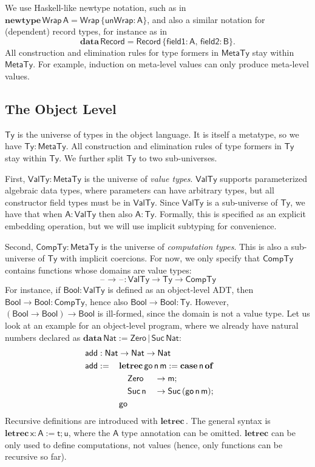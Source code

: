 \documentclass[acmsmall,screen]{acmart}
\newcommand{\mit}[1]{{\mathsf{#1}}}
\newcommand{\msf}[1]{{\mathsf{#1}}}
\newcommand{\mbf}[1]{{\mathbf{#1}}}
\newcommand{\bs}[1]{\boldsymbol{#1}}
\newcommand{\ind}{\hspace{1em}}
\newcommand{\data}{\mbf{data}\,}
\newcommand{\letrec}{\mbf{letrec}\,}
\newcommand{\of}{\mbf{of}\,}
\newcommand{\go}{\mit{go}}
\newcommand{\add}{\mit{add}}
\newcommand{\vm}{\mathsf{m}}
\newcommand{\vn}{\mathsf{n}}
\newcommand{\vA}{\mathsf{A}}
\newcommand{\vB}{\mathsf{B}}
\newcommand{\vx}{\mathsf{x}}
\newcommand{\vt}{\mathsf{t}}
\newcommand{\vu}{\mathsf{u}}
\newcommand{\Bool}{\msf{Bool}}
\newcommand{\case}{\mbf{case\,}}
\newcommand{\MTy}{\msf{MetaTy}}
\newcommand{\VTy}{\msf{ValTy}}
\newcommand{\Ty}{\msf{Ty}}
\newcommand{\CTy}{\msf{CompTy}}
\newcommand{\blank}{{\mathord{\hspace{1pt}\text{--}\hspace{1pt}}}}
\newcommand{\Nat}{\msf{Nat}}
\newcommand{\Zero}{\msf{Zero}}
\newcommand{\Suc}{\msf{Suc}}
\theoremstyle{remark}
\newcommand{\newtype}{\mbf{newtype}\,}
\begin{document}
We use Haskell-like newtype notation, such as in $\newtype \msf{Wrap}\,\vA =
\msf{Wrap}\,\{\mit{unWrap} : \vA \}$, and also a similar notation for (dependent)
record types, for instance as in
\[\data \msf{Record} = \msf{Record}\,\{\mit{field1} : \vA,\,\mit{field2} : \vB\}.\]
All construction and elimination rules for type formers in $\MTy$ stay within
$\MTy$. For example, induction on meta-level values can only produce meta-level
values.

\subsection{The Object Level}\label{sec:the-object-level}

$\bs{\Ty}$ is the universe of types in the object language. It is itself a
metatype, so we have $\Ty : \MTy$. All construction and elimination rules of
type formers in $\Ty$ stay within $\Ty$. We further split $\Ty$ to two
sub-universes.

First, $\bs{\VTy} : \MTy$ is the universe of \emph{value types}. $\VTy$ supports
parameterized algebraic data types, where parameters can have arbitrary types,
but all constructor field types must be in $\VTy$. Since $\VTy$ is a
sub-universe of $\Ty$, we have that when $\vA : \VTy$ then also $\vA :
\Ty$. Formally, this is specified as an explicit embedding operation, but we
will use implicit subtyping for convenience.

Second, $\bs{\CTy} : \MTy$ is the universe of \emph{computation types}. This is
also a sub-universe of $\Ty$ with implicit coercions. For now, we only specify
that $\CTy$ contains functions whose domains are value types:
\[ \blank\to\blank : \VTy \to \Ty \to \CTy \]
For instance, if $\Bool : \VTy$ is defined as an object-level ADT, then $\Bool
\to \Bool : \CTy$, hence also $\Bool \to \Bool : \Ty$. However, $(\Bool \to
\Bool) \to \Bool$ is ill-formed, since the domain is not a value type. Let us look at an
example for an object-level program, where we already have natural numbers
declared as $\data \Nat := \Zero\,|\,\Suc\,\Nat$:
\begin{alignat*}{3}
  &\hspace{-1em}\rlap{$\add : \Nat \to \Nat \to \Nat$}\\
  &\hspace{-1em}\add :=\,&& \mathrlap{\letrec \go\,\vn\,\vm := \case \vn\,\of}\\
  &\hspace{-1em}         && \ind \Zero     &&\to \vm;\\
  &\hspace{-1em}         && \ind \Suc\,\vn &&\to \Suc\,(\go\,\vn\,\vm);\\
  &\hspace{-1em}         && \go
\end{alignat*}
Recursive definitions are introduced with $\letrec$. The general syntax is
$\letrec \vx : \vA := \vt; \vu$, where the $\vA$ type annotation can be
omitted. $\mbf{letrec}$ can be only used to define computations, not values
(hence, only functions can be recursive so far).
\end{document}
